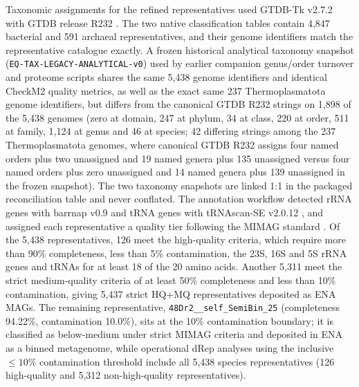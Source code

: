 \begin{revision}
Taxonomic assignments for the refined representatives used GTDB-Tk
v2.7.2 with GTDB release R232 \cite{gtdb}. The two native classification
tables contain 4,847 bacterial and 591 archaeal representatives, and
their genome identifiers match the representative catalogue exactly.
A frozen historical analytical taxonomy snapshot
(\texttt{EQ-TAX-LEGACY-ANALYTICAL-v0}) used by earlier companion
genus/order turnover and proteome scripts shares the same 5,438 genome
identifiers and identical CheckM2 quality metrics, as well as the exact
same 237 Thermoplasmatota genome identifiers, but differs from the
canonical GTDB R232 strings on 1,898 of the 5,438 genomes (zero at
domain, 247 at phylum, 34 at class, 220 at order, 511 at family, 1,124
at genus and 46 at species; 42 differing strings among the 237
Thermoplasmatota genomes, where canonical GTDB R232 assigns four named
orders plus two unassigned and 19 named genera plus 135 unassigned versus
four named orders plus zero unassigned and 14 named genera plus 139
unassigned in the frozen snapshot). The two taxonomy snapshots are
linked 1:1 in the packaged reconciliation table and never conflated.
The annotation workflow detected rRNA genes with barrnap v0.9 and tRNA genes with tRNAscan-SE
v2.0.12 \cite{trnascan}, and assigned each representative a quality tier
following the MIMAG standard \cite{mimag}. Of the 5,438 representatives,
126 meet the high-quality criteria, which require more than 90\%
completeness, less than 5\% contamination, the 23S, 16S and 5S rRNA genes
and tRNAs for at least 18 of the 20 amino acids. Another 5,311 meet the
strict medium-quality criteria of at least 50\% completeness and less than 10\%
contamination, giving 5,437 strict HQ+MQ representatives deposited as ENA
MAGs. The remaining representative, \texttt{48Dr2\_\_self\_SemiBin\_25}
(completeness 94.22\%, contamination 10.0\%), sits at the 10\% contamination
boundary; it is classified as below-medium under strict MIMAG criteria and
deposited in ENA as a binned metagenome, while operational dRep analyses
using the inclusive $\le 10\%$ contamination threshold include all 5,438
species representatives (126 high-quality and 5,312 non-high-quality
representatives).


\end{revision}
